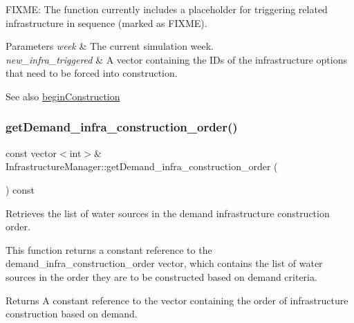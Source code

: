 F\+I\+X\+ME\+: The function currently includes a placeholder for triggering related infrastructure in sequence (marked as F\+I\+X\+ME).


\begin{DoxyParams}{Parameters}
{\em week} & The current simulation week. \\
\hline
{\em new\+\_\+infra\+\_\+triggered} & A vector containing the I\+Ds of the infrastructure options that need to be forced into construction.\\
\hline
\end{DoxyParams}
\begin{DoxySeeAlso}{See also}
\mbox{\hyperlink{classInfrastructureManager_a7d60e4abff73890519ced487c74f2675}{begin\+Construction}} 
\end{DoxySeeAlso}
\mbox{\label{classInfrastructureManager_aac2a99dbffe7f784f09de907ad384d8b}} 
\subsubsection{\texorpdfstring{get\+Demand\+\_\+infra\+\_\+construction\+\_\+order()}{getDemand\_infra\_construction\_order()}}
{\footnotesize\ttfamily const vector$<$int$>$\& Infrastructure\+Manager\+::get\+Demand\+\_\+infra\+\_\+construction\+\_\+order (\begin{DoxyParamCaption}{ }\end{DoxyParamCaption}) const}



Retrieves the list of water sources in the demand infrastructure construction order. 

This function returns a constant reference to the {\ttfamily demand\+\_\+infra\+\_\+construction\+\_\+order} vector, which contains the list of water sources in the order they are to be constructed based on demand criteria.

\begin{DoxyReturn}{Returns}
A constant reference to the vector containing the order of infrastructure construction based on demand. 
\end{DoxyReturn}
\mbox{\label{classInfrastructureManager_a540f233692981645d52af7f1de087dbf}} 
